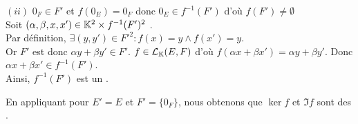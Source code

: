 \documentclass{article}
\begin{document}
\begin{question_kholle}
	$(ii)$ $0_F \in F'$ et $f(0_E) = 0_F$ donc $0_E \in f^{-1}(F')$ d'où $f(F') \neq \emptyset$ \\
	Soit $(\alpha, \beta, x, x') \in \mathbb K^2 \times f^{-1}(F')^2$ \fqs. \\
	Par définition, $\exists (y, y') \in F'^2 : f(x) = y \wedge f(x') = y$. \\
	Or $F'$ est \sev donc $\alpha y + \beta y' \in F'$. $f \in \mathcal{L}_{\mathbb K}(E, F)$ d'où $f(\alpha x + \beta x') = \alpha y + \beta y'$. Donc $\alpha x + \beta x' \in f^{-1}(F')$. \\
	Ainsi, $f^{-1}(F')$ est un \sev.

	En appliquant pour $E' = E$ et $F' = \{0_F\}$, nous obtenons que $\ker f$ et $\Im f$ sont des \sevs.
\end{question_kholle}
\end{document}
